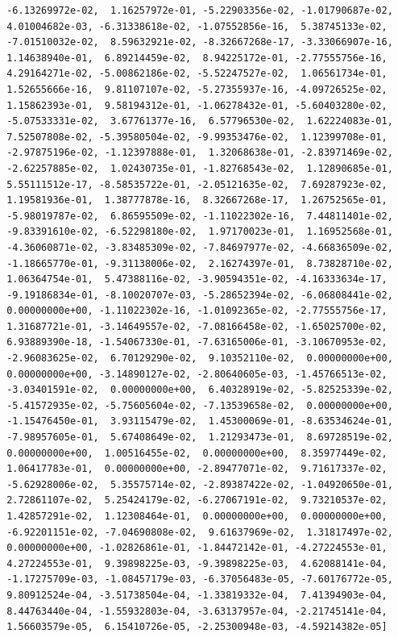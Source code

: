 \documentclass{article}
\begin{document}
\begin{verbatim}
 -6.13269972e-02,  1.16257972e-01, -5.22903356e-02, -1.01790687e-02,
 4.01004682e-03, -6.31338618e-02, -1.07552856e-16,  5.38745133e-02,
 -7.01510032e-02,  8.59632921e-02, -8.32667268e-17, -3.33066907e-16,
 1.14638940e-01,  6.89214459e-02,  8.94225172e-01, -2.77555756e-16,
 4.29164271e-02, -5.00862186e-02, -5.52247527e-02,  1.06561734e-01,
 1.52655666e-16,  9.81107107e-02, -5.27355937e-16, -4.09726525e-02,
 1.15862393e-01,  9.58194312e-01, -1.06278432e-01, -5.60403280e-02,
 -5.07533331e-02,  3.67761377e-16,  6.57796530e-02,  1.62224083e-01,
 7.52507808e-02, -5.39580504e-02, -9.99353476e-02,  1.12399708e-01,
 -2.97875196e-02, -1.12397888e-01,  1.32068638e-01, -2.83971469e-02,
 -2.62257885e-02,  1.02430735e-01, -1.82768543e-02,  1.12890685e-01,
 5.55111512e-17, -8.58535722e-01, -2.05121635e-02,  7.69287923e-02,
 1.19581936e-01,  1.38777878e-16,  8.32667268e-17,  1.26752565e-01,
 -5.98019787e-02,  6.86595509e-02, -1.11022302e-16,  7.44811401e-02,
 -9.83391610e-02, -6.52298180e-02,  1.97170023e-01,  1.16952568e-01,
 -4.36060871e-02, -3.83485309e-02, -7.84697977e-02, -4.66836509e-02,
 -1.18665770e-01, -9.31138006e-02,  2.16274397e-01,  8.73828710e-02,
 1.06364754e-01,  5.47388116e-02, -3.90594351e-02, -4.16333634e-17,
 -9.19186834e-01, -8.10020707e-03, -5.28652394e-02, -6.06808441e-02,
 0.00000000e+00, -1.11022302e-16, -1.01092365e-02, -2.77555756e-17,
 1.31687721e-01, -3.14649557e-02, -7.08166458e-02, -1.65025700e-02,
 6.93889390e-18, -1.54067330e-01, -7.63165006e-01, -3.10670953e-02,
 -2.96083625e-02,  6.70129290e-02,  9.10352110e-02,  0.00000000e+00,
 0.00000000e+00, -3.14890127e-02, -2.80640605e-03, -1.45766513e-02,
 -3.03401591e-02,  0.00000000e+00,  6.40328919e-02, -5.82525339e-02,
 -5.41572935e-02, -5.75605604e-02, -7.13539658e-02,  0.00000000e+00,
 -1.15476450e-01,  3.93115479e-02,  1.45300069e-01, -8.63534624e-01,
 -7.98957605e-01,  5.67408649e-02,  1.21293473e-01,  8.69728519e-02,
 0.00000000e+00,  1.00516455e-02,  0.00000000e+00,  8.35977449e-02,
 1.06417783e-01,  0.00000000e+00, -2.89477071e-02,  9.71617337e-02,
 -5.62928006e-02,  5.35575714e-02, -2.89387422e-02, -1.04920650e-01,
 2.72861107e-02,  5.25424179e-02, -6.27067191e-02,  9.73210537e-02,
 1.42857291e-02,  1.12308464e-01,  0.00000000e+00,  0.00000000e+00,
 -6.92201151e-02, -7.04690808e-02,  9.61637969e-02,  1.31817497e-02,
 0.00000000e+00, -1.02826861e-01, -1.84472142e-01, -4.27224553e-01,
 4.27224553e-01,  9.39898225e-03, -9.39898225e-03,  4.62088141e-04,
 -1.17275709e-03, -1.08457179e-03, -6.37056483e-05, -7.60176772e-05,
 9.80912524e-04, -3.51738504e-04, -1.33819332e-04,  7.41394903e-04,
 8.44763440e-04, -1.55932803e-04, -3.63137957e-04, -2.21745141e-04,
 1.56603579e-05,  6.15410726e-05, -2.25300948e-03, -4.59214382e-05]
\end{verbatim}
\end{document}
